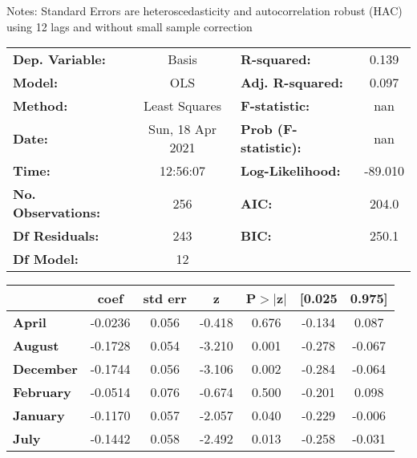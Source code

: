 Notes: \newline
 [1] Standard Errors are heteroscedasticity and autocorrelation robust (HAC) using 12 lags and without small sample correction
\begin{center}
\begin{tabular}{lclc}
\toprule
\textbf{Dep. Variable:}    &      Basis       & \textbf{  R-squared:         } &     0.139   \\
\textbf{Model:}            &       OLS        & \textbf{  Adj. R-squared:    } &     0.097   \\
\textbf{Method:}           &  Least Squares   & \textbf{  F-statistic:       } &       nan   \\
\textbf{Date:}             & Sun, 18 Apr 2021 & \textbf{  Prob (F-statistic):} &      nan    \\
\textbf{Time:}             &     12:56:07     & \textbf{  Log-Likelihood:    } &   -89.010   \\
\textbf{No. Observations:} &         256      & \textbf{  AIC:               } &     204.0   \\
\textbf{Df Residuals:}     &         243      & \textbf{  BIC:               } &     250.1   \\
\textbf{Df Model:}         &          12      & \textbf{                     } &             \\
\bottomrule
\end{tabular}
\begin{tabular}{lcccccc}
                   & \textbf{coef} & \textbf{std err} & \textbf{z} & \textbf{P$> |$z$|$} & \textbf{[0.025} & \textbf{0.975]}  \\
\midrule
\textbf{April}     &      -0.0236  &        0.056     &    -0.418  &         0.676        &       -0.134    &        0.087     \\
\textbf{August}    &      -0.1728  &        0.054     &    -3.210  &         0.001        &       -0.278    &       -0.067     \\
\textbf{December}  &      -0.1744  &        0.056     &    -3.106  &         0.002        &       -0.284    &       -0.064     \\
\textbf{February}  &      -0.0514  &        0.076     &    -0.674  &         0.500        &       -0.201    &        0.098     \\
\textbf{January}   &      -0.1170  &        0.057     &    -2.057  &         0.040        &       -0.229    &       -0.006     \\
\textbf{July}      &      -0.1442  &        0.058     &    -2.492  &         0.013        &       -0.258    &       -0.031     \\

\end{tabular}
\end{center}
